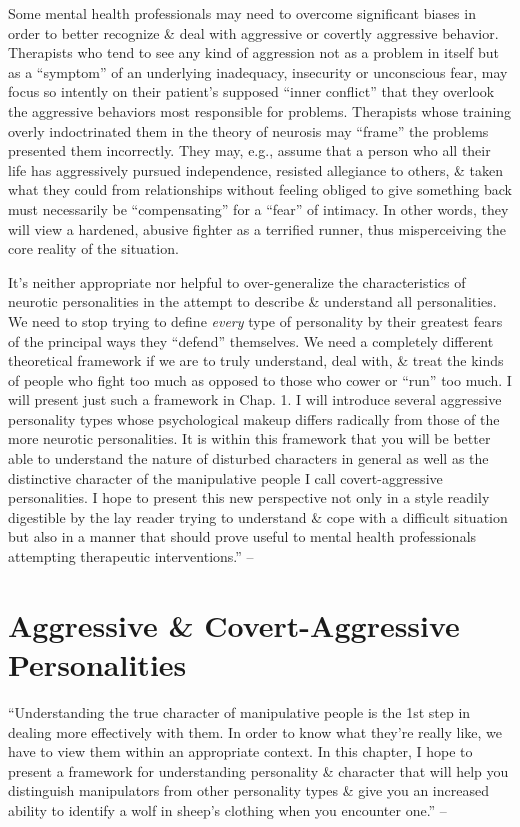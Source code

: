 \documentclass{article}
\numberwithin{equation}{section}
\begin{document}
Some mental health professionals may need to overcome significant biases in order to better recognize \& deal with aggressive or covertly aggressive behavior. Therapists who tend to see any kind of aggression not as a problem in itself but as a ``symptom'' of an underlying inadequacy, insecurity or unconscious fear, may focus so intently on their patient's supposed ``inner conflict'' that they overlook the aggressive behaviors most responsible for problems. Therapists whose training overly indoctrinated them in the theory of neurosis may ``frame'' the problems presented them incorrectly. They may, e.g., assume that a person who all their life has aggressively pursued independence, resisted allegiance to others, \& taken what they could from relationships without feeling obliged to give something back must necessarily be ``compensating'' for a ``fear'' of intimacy. In other words, they will view a hardened, abusive fighter as a terrified runner, thus misperceiving the core reality of the situation.

It's neither appropriate nor helpful to over-generalize the characteristics of neurotic personalities in the attempt to describe \& understand all personalities. We need to stop trying to define \textit{every} type of personality by their greatest fears of the principal ways they ``defend'' themselves. We need a completely different theoretical framework if we are to truly understand, deal with, \& treat the kinds of people who fight too much as opposed to those who cower or ``run'' too much. I will present just such a framework in Chap. 1. I will introduce several aggressive personality types whose psychological makeup differs radically from those of the more neurotic personalities. It is within this framework that you will be better able to understand the nature of disturbed characters in general as well as the distinctive character of the manipulative people I call covert-aggressive personalities. I hope to present this new perspective not only in a style readily digestible by the lay reader trying to understand \& cope with a difficult situation but also in a manner that should prove useful to mental health professionals attempting therapeutic interventions.'' -- \cite[pp. 25--26]{Simon2010}


\section{Aggressive \& Covert-Aggressive Personalities}
``Understanding the true character of manipulative people is the 1st step in dealing more effectively with them. In order to know what they're really like, we have to view them within an appropriate context. In this chapter, I hope to present a framework for understanding personality \& character that will help you distinguish manipulators from other personality types \& give you an increased ability to identify a wolf in sheep's clothing when you encounter one.'' -- \cite[p. 27]{Simon2010}
\end{document}
